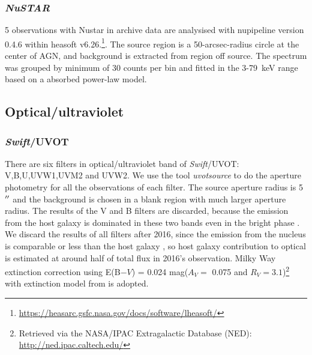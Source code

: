 \documentclass{aastex63}
\newcommand{\nustar}{{\em NuSTAR}}
\newcommand{\swift}{{\em Swift}}
\begin{document}
\subsubsection{\nustar}
5 observations with Nustar in archive data are analysised with nupipeline version 0.4.6 within heasoft v6.26.\footnote{\url{https://heasarc.gsfc.nasa.gov/docs/software/lheasoft/}}. The source region is a 50-arcsec-radius circle at the center of AGN, and background is extracted from region off source. The spectrum was grouped by minimum of 30 counts per bin and fitted in the 3-79~keV range based on a absorbed power-law model.


\subsection{Optical/ultraviolet}
\subsubsection{\swift/UVOT}
There are six filters in optical/ultraviolet band of \swift/UVOT: V,B,U,UVW1,UVM2 and UVW2. We use the tool \textit{uvotsource} to do the aperture photometry for all the observations of each filter. The source aperture radius is 5$\mbox{$^{\prime\prime}$}$ and the background is chosen in a blank region with much larger aperture radius. The results of the V and B filters are discarded, because the emission from the host galaxy is dominated in these two bands even in the bright phase \citep{2018MNRAS.480.3898N}. We discard the results of all filters after 2016, since the emission from the nucleus is comparable or less than the host galaxy \citep{2018MNRAS.480.3898N}, so host galaxy contribution to optical is estimated at around half of total flux in 2016's observation.  Milky Way extinction correction using \texorpdfstring{E(B$-V$) = 0.024}. mag($A_V=$ 0.075 and $R_{V}=3.1$)\footnote{Retrieved via the NASA/IPAC Extragalactic Database (NED): \url{http://ned.ipac.caltech.edu/}} with extinction model from \citet{2007ApJ...663..320F} is adopted.  
\end{document}
